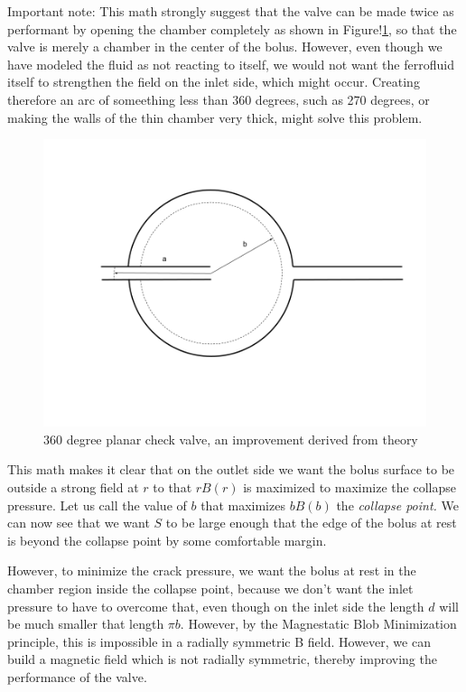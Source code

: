 \documentclass[]{asme2ej}
\begin{document}
Important note: This math strongly suggest that the valve can be
made twice as performant by opening the chamber completely as shown in Figure!\ref{fig:360}, so that the
valve is merely a chamber in the center of the bolus.
However, even though we have modeled the fluid as not reacting to itself,
we would not want the ferrofluid itself
to strengthen the field on the inlet side, which might occur. Creating
therefore an arc of someething less than 360 degrees, such as 270 degrees,
or making the walls of the thin chamber very thick, might solve this problem.
\begin{figure}[H]
\centerline{\includegraphics[width=6in]{figure/360degreeplanarcheckvalve.png}}
\caption{360 degree planar check valve, an improvement derived from theory}
\label{fig:360}
\end{figure}
This math makes it clear that on the outlet side we want the
bolus surface to be outside a strong field at $r$ to that $r B(r)$ is
maximized to maximize the collapse pressure.
Let us call the value of $b$ that maximizes $b B(b)$ the {\em collapse point.}
We can now see that we want $S$ to be large enough that the edge
of the bolus at rest is beyond the collapse point by some
comfortable margin.

However, to minimize the crack pressure, we want the bolus at rest
in the chamber region inside
the collapse point, because we don't want the inlet pressure to have
to overcome that, even though on the inlet side the length $d$ will
be much smaller that length $\pi b$. However, by the
Magnestatic Blob Minimization principle, this is impossible in a
radially symmetric B field. However, we can build a magnetic field
which is not radially symmetric, thereby improving the performance of the valve.
\end{document}
